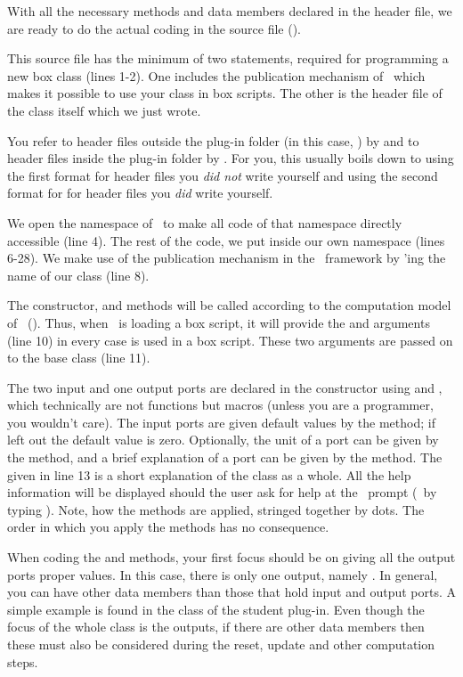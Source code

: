 With all the necessary methods and data members declared in the header file, we are ready to do the actual coding in the source file ().

This source file has the minimum of two  statements, required for programming a new box class (lines 1-2). One includes the publication mechanism of \US\ which makes it possible to use your class in box scripts. The other is the header file of the class itself which we just wrote. 

You refer to header files outside the plug-in folder (in this case, ) by  and to header files inside the plug-in folder by . For you, this usually boils down to using the first format for header files you \emph{did not} write yourself and using the second format for for header files you \emph{did} write yourself.

We open the  namespace of \US\ to make all code of that namespace directly accessible (line 4). The rest of the code, we put inside our own namespace  (lines 6-28). We make use of the publication mechanism in the \US\ framework by 'ing the name of our class (line 8).

The constructor,  and  methods will be called according to the computation model of \US\ (). Thus, when \US\ is loading a box script, it will provide the  and  arguments (line 10) in every case  is used in a box script. These two arguments are passed on to the  base class (line 11).

The two input and one output ports are declared in the constructor using  and , which technically are not functions but macros (unless you are a programmer, you wouldn't care). The input ports are given default values by the  method; if left out the default value is zero. Optionally, the unit of a port can be given by the  method, and a brief explanation of a port can be given by the  method. The  given in line 13 is a short explanation of the class as a whole. All the help information will be displayed should the user ask for  help at the \US\ prompt (\ie\ by typing ). Note, how the methods are applied, stringed together by dots. The order in which you apply the methods has no consequence.

When coding the  and  methods, your first focus should be on giving all the output ports proper values. In this case, there is only one output, namely . In general, you can have other data members than those that hold input and output ports. A simple example is found in the  class of the student plug-in. Even though the focus of the whole class is the outputs, if there are other data members then these must also be considered during the reset, update and other computation steps.

